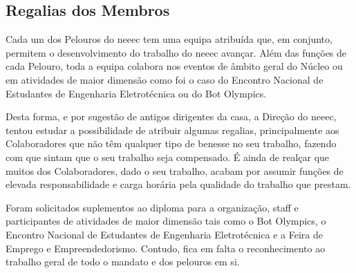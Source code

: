
\subsection{Regalias dos Membros}

Cada um dos Pelouros do \acrshort{neeec} tem uma equipa atribuída que, em conjunto, permitem o desenvolvimento do trabalho do \acrshort{neeec} avançar. Além das funções de cada Pelouro, toda a equipa colabora nos eventos de âmbito geral do Núcleo ou em atividades de maior dimensão como foi o caso do Encontro Nacional de Estudantes de Engenharia Eletrotécnica ou do Bot Olympics.

Desta forma, e por sugestão de antigos dirigentes da casa, a Direção do \acrshort{neeec}, tentou estudar a possibilidade de atribuir algumas regalias, principalmente aos Colaboradores que não têm qualquer tipo de benesse no seu trabalho, fazendo com que sintam que o seu trabalho seja compensado. É ainda de realçar que muitos dos Colaboradores, dado o seu trabalho, acabam por assumir funções de elevada responsabilidade e carga horária pela qualidade do trabalho que prestam.

Foram solicitados suplementos ao diploma para a organização, staff e participantes de atividades de maior dimensão tais como o Bot Olympics, o Encontro Nacional de Estudantes de Engenharia Eletrotécnica e a Feira de Emprego e Empreendedorismo. Contudo, fica em falta o reconhecimento ao trabalho geral de todo o mandato e dos pelouros em si.

